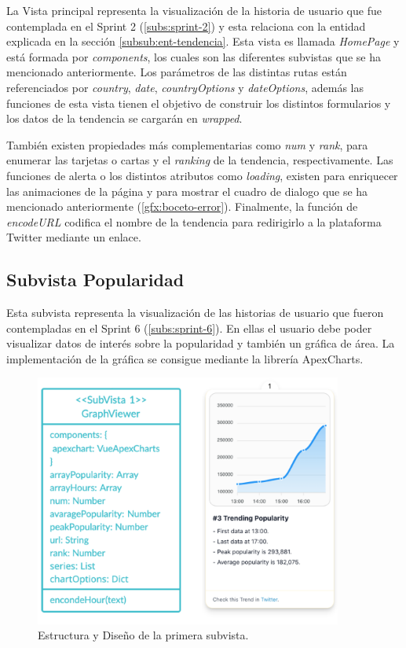 La Vista principal representa la visualización de la historia de usuario que fue contemplada en el Sprint 2 (\ref{subs:sprint-2}) y esta relaciona con la entidad explicada en la sección \ref{subsub:ent-tendencia}. Esta vista es llamada \textit{HomePage} y está formada por \textit{components}, los cuales son las diferentes subvistas que se ha mencionado anteriormente. Los parámetros de las distintas rutas están referenciados por \textit{country}, \textit{date}, \textit{countryOptions} y \textit{dateOptions}, además las funciones de esta vista tienen el objetivo de construir los distintos formularios y los datos de la tendencia se cargarán en \textit{wrapped}.

\vspace{0.3cm}

También existen propiedades más complementarias como \textit{num} y \textit{rank}, para enumerar las tarjetas o cartas y el \textit{ranking} de la tendencia, respectivamente. Las funciones de alerta o los distintos atributos como \textit{loading}, existen para enriquecer las animaciones de la página y para mostrar el cuadro de dialogo que se ha mencionado anteriormente (\ref{gfx:boceto-error}). Finalmente, la función de \textit{encodeURL} codifica el nombre de la tendencia para redirigirlo a la plataforma Twitter mediante un enlace.

\subsection{Subvista Popularidad}
Esta subvista representa la visualización de las historias de usuario que fueron contempladas en el Sprint 6 (\ref{subs:sprint-6}). En ellas el usuario debe poder visualizar datos de interés sobre la popularidad y también un gráfica de área. La implementación de la gráfica se consigue mediante la librería ApexCharts.

\begin{figure}[H]
    \centering
    \myfloatalign
    \includegraphics[width=0.9\textwidth]{gfx/subvista1.png}
    \caption[Estructura y Diseño de la primera subvista]{Estructura y Diseño de la primera subvista.}\label{gfx:subvista1}
\end{figure}

